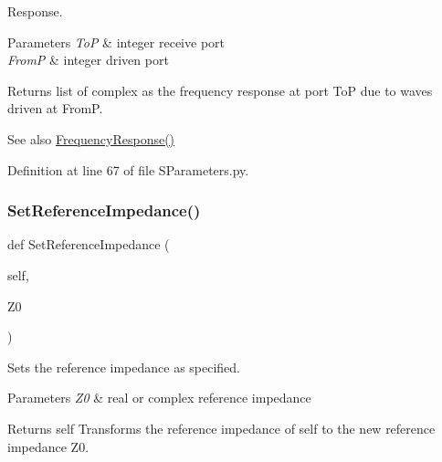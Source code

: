 Response. 


\begin{DoxyParams}{Parameters}
{\em ToP} & integer receive port \\
\hline
{\em FromP} & integer driven port \\
\hline
\end{DoxyParams}
\begin{DoxyReturn}{Returns}
list of complex as the frequency response at port ToP due to waves driven at FromP. 
\end{DoxyReturn}
\begin{DoxySeeAlso}{See also}
\hyperlink{classSignalIntegrity_1_1SParameters_1_1SParameters_1_1SParameters_a55a7157cd888766a891ff22694e62613}{Frequency\+Response()} 
\end{DoxySeeAlso}


Definition at line 67 of file S\+Parameters.\+py.

\mbox{\label{classSignalIntegrity_1_1SParameters_1_1SParameters_1_1SParameters_a98bb8cca60faa48d8aa1b2b667c36037}} 
\subsubsection{\texorpdfstring{Set\+Reference\+Impedance()}{SetReferenceImpedance()}}
{\footnotesize\ttfamily def Set\+Reference\+Impedance (\begin{DoxyParamCaption}\item[{}]{self,  }\item[{}]{Z0 }\end{DoxyParamCaption})}



Sets the reference impedance as specified. 


\begin{DoxyParams}{Parameters}
{\em Z0} & real or complex reference impedance \\
\hline
\end{DoxyParams}
\begin{DoxyReturn}{Returns}
self Transforms the reference impedance of self to the new reference impedance Z0. 
\end{DoxyReturn}


